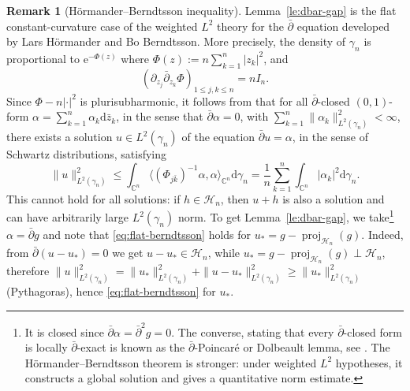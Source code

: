 \documentclass[11pt,reqno]{amsart}
\numberwithin{equation}{section}%
\numberwithin{figure}{section}%
\numberwithin{table}{section}
\theoremstyle{plain}
\theoremstyle{definition}
\newtheorem{remark}[theorem]{Remark}
\begin{document}
\begin{remark}[Hörmander--Berndtsson inequality]\label{rm:horber}
  Lemma~\ref{le:dbar-gap} is the flat constant-curvature case of the weighted
  $L^2$ theory for the $\bar\partial$ equation developed by Lars Hörmander and
  Bo Berndtsson. More precisely, the density of $\gamma_n$ is proportional to
  $\mathrm{e}^{-\Phi(z)}$ where $\Phi(z):=n\sum_{k=1}^n|z_k|^2$, and
  \begin{equation}
    {(\partial_{z_j}\bar\partial_{z_k}\Phi)}_{1\leq j,k\leq n}=nI_n.
  \end{equation}
  Since $\Phi-n\left|\cdot\right|^2$ is plurisubharmonic, it follows from
  \citet[Th.~1.1.1]{BerndtssonDbarMethods} that for all $\bar\partial$-closed
  $(0,1)$-form $\alpha=\sum_{k=1}^n\alpha_k\mathrm{d}{\bar z_k}$, in the sense
  that $\bar\partial\alpha=0$, with
  $ \sum_{k=1}^n\|\alpha_k\|_{L^2(\gamma_n)}^2<\infty$, there exists a
  solution $u\in L^2(\gamma_n)$ of the equation $\bar\partial u=\alpha$, in
  the sense of Schwartz distributions, satisfying %
  \begin{equation}\label{eq:flat-berndtsson}
    \|u\|_{L^2(\gamma_n)}^2
    \leq
    \int_{\mathbb{C}^n}\langle (\Phi_{j\bar k})^{-1}\alpha,\alpha\rangle_{\mathbb{C}^n}\mathrm{d}\gamma_n
    =\frac{1}{n}\sum_{k=1}^n\int_{\mathbb{C}^n}|\alpha_k|^2\mathrm{d}\gamma_n.
  \end{equation}
  This cannot hold for all solutions: if $h\in\mathcal{H}_n$, then $u+h$ is
  also a solution and can have arbitrarily large $L^2(\gamma_n)$ norm. To get
  Lemma~\ref{le:dbar-gap}, we take\footnote{It is closed since
    $\bar\partial\alpha=\bar\partial^2g=0$. The converse, stating that every
    $\bar\partial$-closed form is locally $\bar\partial$-exact is known as the
    $\bar\partial$-Poincaré or Dolbeault %
    lemma, see \cite[Th.~2.3.3 and
    p.59]{HormanderComplexAnalysisSeveralVariables}. The Hörmander--Berndtsson
    theorem is stronger: under weighted $L^2$ hypotheses, it constructs a
    global solution and gives a quantitative norm estimate.}
  $\alpha=\bar\partial g$ and note that \eqref{eq:flat-berndtsson} holds for
  $u_*=g-\operatorname{proj}_{\mathcal{H}_n}(g)$. Indeed, from
  $\bar\partial(u-u_*)=0$ we get $u-u_*\in\mathcal{H}_n$, while
  $u_*=g-\operatorname{proj}_{\mathcal{H}_n}(g)\perp\mathcal{H}_n$, therefore
  $\|u\|_{L^2(\gamma_n)}^2=\|u_*\|_{L^2(\gamma_n)}^2+\|u-u_*\|_{L^2(\gamma_n)}^2\geq
  \|u_*\|_{L^2(\gamma_n)}^2$ (Pythagoras), hence \eqref{eq:flat-berndtsson}
  for $u_*$.
\end{remark}
\end{document}
